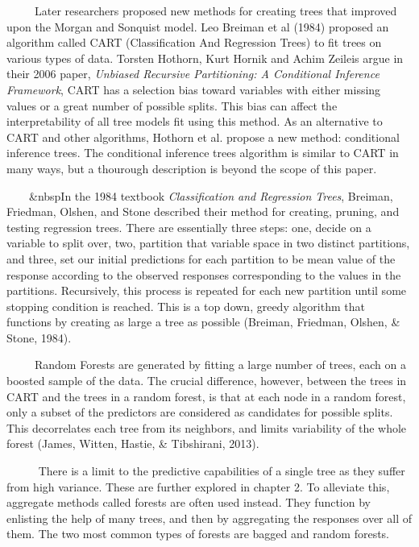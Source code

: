 \documentclass[12pt,twoside]{reedthesis}
\begin{document}
  ~~~~~Later researchers proposed new methods for creating trees that
  improved upon the Morgan and Sonquist model. Leo Breiman et al (1984)
  proposed an algorithm called CART (Classification And Regression Trees)
  to fit trees on various types of data. Torsten Hothorn, Kurt Hornik and
  Achim Zeileis argue in their 2006 paper, \emph{Unbiased Recursive
  Partitioning: A Conditional Inference Framework}, CART has a selection
  bias toward variables with either missing values or a great number of
  possible splits. This bias can affect the interpretability of all tree
  models fit using this method. As an alternative to CART and other
  algorithms, Hothorn et al. propose a new method: conditional inference
  trees. The conditional inference trees algorithm is similar to CART in
  many ways, but a thourough description is beyond the scope of this
  paper.
  
  ~~~~\&nbspIn the 1984 textbook \emph{Classification and Regression
  Trees}, Breiman, Friedman, Olshen, and Stone described their method for
  creating, pruning, and testing regression trees. There are essentially
  three steps: one, decide on a variable to split over, two, partition
  that variable space in two distinct partitions, and three, set our
  initial predictions for each partition to be mean value of the response
  according to the observed responses corresponding to the values in the
  partitions. Recursively, this process is repeated for each new partition
  until some stopping condition is reached. This is a top down, greedy
  algorithm that functions by creating as large a tree as possible
  (Breiman, Friedman, Olshen, \& Stone, 1984).
  
  ~~~~~Random Forests are generated by fitting a large number of trees,
  each on a boosted sample of the data. The crucial difference, however,
  between the trees in CART and the trees in a random forest, is that at
  each node in a random forest, only a subset of the predictors are
  considered as candidates for possible splits. This decorrelates each
  tree from its neighbors, and limits variability of the whole forest
  (James, Witten, Hastie, \& Tibshirani, 2013).
  
  ~~~~~ There is a limit to the predictive capabilities of a single tree
  as they suffer from high variance. These are further explored in chapter
  2. To alleviate this, aggregate methods called forests are often used
  instead. They function by enlisting the help of many trees, and then by
  aggregating the responses over all of them. The two most common types of
  forests are bagged and random forests.
  
\end{document}
